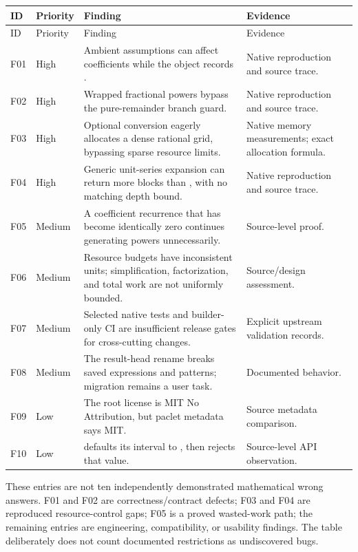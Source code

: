 \documentclass[11pt,a4paper]{article}
\newcommand{\code}[1]{\texttt{\detokenize{#1}}}
\begin{document}
\begingroup\small
\begin{longtable}{@{}p{}p{}>{\raggedright\arraybackslash}p{}>{\raggedright\arraybackslash}p{}@{}}
\toprule ID & Priority & Finding & Evidence\\\midrule\endfirsthead
\toprule ID & Priority & Finding & Evidence\\\midrule\endhead
F01 & High & Ambient assumptions can affect coefficients while the object records \code{Assumptions -> True}. & Native reproduction and source trace.\\
F02 & High & Wrapped \code{SeriesObservable} fractional powers bypass the pure-remainder branch guard. & Native reproduction and source trace.\\
F03 & High & Optional \code{SeriesData} conversion eagerly allocates a dense rational grid, bypassing sparse resource limits. & Native memory measurements; exact allocation formula.\\
F04 & High & Generic unit-series expansion can return more blocks than \code{MaxTerms}, with no matching depth bound. & Native reproduction and source trace.\\
F05 & Medium & A coefficient recurrence that has become identically zero continues generating powers unnecessarily. & Source-level proof.\\
F06 & Medium & Resource budgets have inconsistent units; simplification, factorization, and total work are not uniformly bounded. & Source/design assessment.\\
F07 & Medium & Selected native tests and builder-only CI are insufficient release gates for cross-cutting changes. & Explicit upstream validation records.\\
F08 & Medium & The result-head rename breaks saved expressions and patterns; migration remains a user task. & Documented behavior.\\
F09 & Low & The root license is MIT No Attribution, but paclet metadata says MIT. & Source metadata comparison.\\
F10 & Low & \code{InverseCertificate} defaults its interval to \code{Automatic}, then rejects that value. & Source-level API observation.\\
\bottomrule
\end{longtable}
\endgroup

These entries are not ten independently demonstrated mathematical wrong answers. F01 and F02 are correctness/contract defects; F03 and F04 are reproduced resource-control gaps; F05 is a proved wasted-work path; the remaining entries are engineering, compatibility, or usability findings. The table deliberately does not count documented restrictions as undiscovered bugs.
\end{document}
